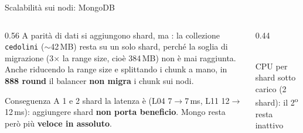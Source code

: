 \documentclass[aspectratio=169,11pt]{beamer}
\begin{document}
\begin{frame}{Scalabilità sui nodi: MongoDB}
  \begin{columns}[c]
    \begin{column}{0.56\textwidth}
      \small A parità di dati si aggiungono shard, ma : la collezione \texttt{cedolini} (${\sim}$42\,MB) resta su un solo shard, perché la soglia di migrazione (3$\times$ la range size, cioè 384\,MB) non è mai raggiunta. 
      Anche riducendo la range size e splittando i chunk a mano, in \textbf{888 round} il balancer \textbf{non migra} i chunk sui nodi.
      \vspace{0.3em}
      \begin{keyblock}{Conseguenza}
        A 1 e 2 shard la latenza è  (L04 7$\to$7\,ms, L11 12$\to$12\,ms): aggiungere shard \textbf{non porta beneficio}. Mongo resta però più \textbf{veloce in assoluto}.
      \end{keyblock}
    \end{column}
    \begin{column}{0.44\textwidth}
      \centering
      \\
      {\scriptsize\color{grigio}CPU per shard sotto carico (2 shard): il 2\textsuperscript{o} resta inattivo}
    \end{column}
  \end{columns}
\end{frame}
\end{document}

